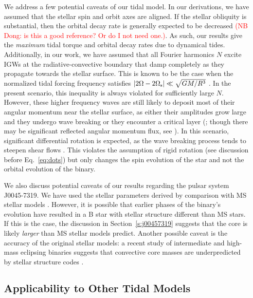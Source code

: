 \documentclass[
        fleqn,
        usenatbib,
    ]{mnras}
\newcommand*{\abs}[1]{\left|#1\right|}
\begin{document}
We address a few potential caveats of our tidal model. In our derivations, we
have assumed that the stellar spin and orbit axes are aligned. If the stellar
obliquity is substantial, then the orbital decay rate is generally expected to
be decreased \citep[see e.g.][]{lai2012tidal} \textcolor{red}{(NB Dong: is this
a good reference? Or do I not need one.)}. As such, our results give the
\emph{maximum} tidal torque and orbital decay rates due to dynamical tides.
Additionally, in our work, we have assumed that all Fourier harmonics $N$ excite
IGWs at the radiative-convective boundary that damp completely as they propagate
towards the stellar surface. This is known to be the case when the normalized
tidal forcing frequency satisfies $\abs{2\Omega - 2\Omega_{\rm s}} \ll \sqrt{GM
/ R^3}$ \citep{zahn1975dynamical, kushnir}. In the present scenario, this
inequality is always violated for sufficiently large $N$. However, these higher
frequency waves are still likely to deposit most of their angular momentum near
the stellar surface, as either their amplitudes grow large and they undergo wave
breaking or they encounter a critical layer (\citealp{goldreich1989tidal};
though there may be significant reflected angular momentum flux, see
\citealp{su2020}). In this scenario, significant differential rotation is
expected, as the wave breaking process tends to steepen shear flows
\citep{su2020}. This violates the assumption of rigid rotation (see discussion
before Eq.~\ref{eq:dots}) but only changes the spin evolution of the star and
not the orbital evolution of the binary.

We also discuss potential caveats of our results regarding the pulsar system
J0045-7319. We have used the stellar parameters derived by comparison with MS
stellar models \citep{kumar1998}. However, it is possible that earlier phases of
the binary's evolution have resulted in a B star with stellar structure
different than MS stars. If this is the case, the discussion in
Section~\ref{s:j00457319} suggests that the core is likely \emph{larger} than MS
stellar models predict. Another possible caveat is the accuracy of the original
stellar models: a recent study of intermediate and high-mass eclipsing binaries
suggests that convective core masses are underpredicted by stellar structure
codes \citep{larger_conv_masses}.

\subsection{Applicability to Other Tidal Models}
\end{document}
